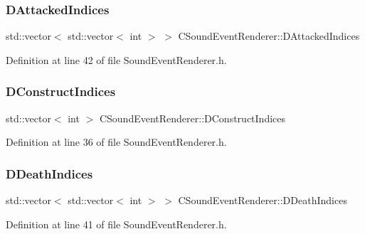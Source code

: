 \subsubsection{\texorpdfstring{D\+Attacked\+Indices}{DAttackedIndices}}
{\footnotesize\ttfamily std\+::vector$<$ std\+::vector$<$ int $>$ $>$ C\+Sound\+Event\+Renderer\+::\+D\+Attacked\+Indices\hspace{0.3cm}{\ttfamily [protected]}}



Definition at line 42 of file Sound\+Event\+Renderer.\+h.

\hypertarget{classCSoundEventRenderer_ad49edcbf2abf0ecef518c843475098e2}{}\label{classCSoundEventRenderer_ad49edcbf2abf0ecef518c843475098e2} 
\subsubsection{\texorpdfstring{D\+Construct\+Indices}{DConstructIndices}}
{\footnotesize\ttfamily std\+::vector$<$ int $>$ C\+Sound\+Event\+Renderer\+::\+D\+Construct\+Indices\hspace{0.3cm}{\ttfamily [protected]}}



Definition at line 36 of file Sound\+Event\+Renderer.\+h.

\hypertarget{classCSoundEventRenderer_a6b250e51c42870715c12ea47b99b9594}{}\label{classCSoundEventRenderer_a6b250e51c42870715c12ea47b99b9594} 
\subsubsection{\texorpdfstring{D\+Death\+Indices}{DDeathIndices}}
{\footnotesize\ttfamily std\+::vector$<$ std\+::vector$<$ int $>$ $>$ C\+Sound\+Event\+Renderer\+::\+D\+Death\+Indices\hspace{0.3cm}{\ttfamily [protected]}}



Definition at line 41 of file Sound\+Event\+Renderer.\+h.

\hypertarget{classCSoundEventRenderer_a8e36efd07e98242ea3a80564c595e397}{}\label{classCSoundEventRenderer_a8e36efd07e98242ea3a80564c595e397} 

